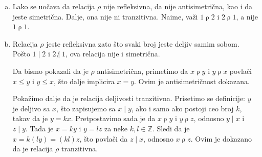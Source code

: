 {{\begin{enumerate}[(a)]
Jo\v s jedan na\v cin da poka\v zemo da je relacija $\rho$ antisimetri\v cna bio bi slede\' ci. Primetimo da $x\mathrel\rho y$ implicira da je $x>y$. Prema tome, za ma koje prirodne brojeve $x$ i $y$, $x\mathrel\rho y$ i $y\mathrel\rho x$ implicira $x>y$ i $y>x$, \v sto je nemogu\' ce, \v cime je dokazano da je $\rho $ antisimetri\v cna.

Primetimo i  da u gornjem dokazu antisimetri\v cnosti iz pretpostavke da je $x\mathrel\rho y$ i $y\mathrel\rho x$ nismo na kraju dobili $x=y$. Ovo ne predstavlja problem, jer smo demonstrirali da $x\mathrel\rho y$ i $y\mathrel\rho x$ nije ta\v cno, a samim tim je implikacija $x\mathrel\rho y\wedge y\mathrel\rho x\Rightarrow x=y$ ta\v cna za sve $x,y\in\mathbb N$.

Kona\v cno, poka\v zimo da je $\rho$ tranzitivna relacija. Neka je $x\mathrel\rho y$ i $y\mathrel\rho z$. Tada je $x=3^ky$ i $y=3^lz$ za neke $k,l\in\mathbb N$. Odavde dobijamo $x=3^k(3^lz)=3^{k+l}z$, odakle sledi da je $x\mathrel\rho z$. Ovim je pokazano da je $\rho$ tranzitivna relacija. 

\item Lako se uo\v cava da relacija $\rho$ nije refleksivna, da nije antisimetri\v cna, kao i da jeste simetri\v cna. Dalje, ona nije ni tranzitivna. Naime, va\v zi $1\mathrel\rho 2$ i $2\mathrel\rho 1$, a nije $1\mathrel\rho 1$.

\item Relacija $\rho$ jeste refleksivna zato \v sto svaki broj jeste deljiv samim sobom. Po\v sto $1\mid 2$ i $2\mathrel{\not|} 1$, ova relacija nije i simetri\v cna.

Da bismo pokazali da je $\rho$ antisimetri\v cna, primetimo da $x\mathrel\rho y$ i $y\mathrel\rho x$ povla\v ci $x\leq y$ i $y\leq x$, \v sto dalje implicira $x=y$. Ovim je antisimetri\v cnost dokazana.

Poka\v zimo dalje da je relacija deljivosti tranzitivna. Prisetimo se definicije: $y$ je deljivo sa $x$, \v sto zapisujemo sa $x\mid y$, ako i samo ako postoji ceo broj $k$, takav da je $y=kx$. Pretpostavimo sada je da $x\mathrel\rho y$ i $y\mathrel\rho z$, odnosno $y\mid x$ i $z\mid y$. Tada je $x=ky$ i $y=lz$ za neke $k,l\in\mathbb Z$. Sledi da je $x=k(ly)=(kl)z$, \v sto povla\v ci da $z\mid x$, odnosno $x\mathrel\rho z$. Ovim je dokazano da je relacija $\rho$ tranzitivna.
\end{enumerate}
}

}
